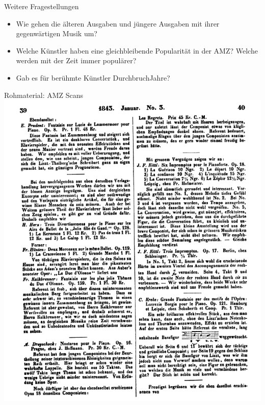 \documentclass[aspectratio=169]{beamer}
\begin{document}
\begin{frame}{Weitere Fragestellungen}
	  	\begin{itemize}
	  		\item Wie gehen die älteren Ausgaben und jüngere Ausgaben mit ihrer gegenwärtigen Musik um?
	  		\item Welche Künstler haben eine gleichbleibende Popularität in der AMZ? Welche werden mit der Zeit immer populärer?
	  		\item Gab es für berühmte Künstler \glqq Durchbruch\grqq Jahre?
	  		
	  	\end{itemize}
\end{frame}
\begin{frame}{Rohmaterial: AMZ Scans}
	\includegraphics[scale=.29]{"data/amzscreenshot.png"}
\end{frame}
\end{document}
